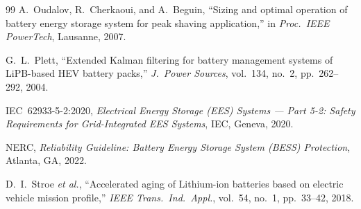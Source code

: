 \documentclass[11pt, a4paper]{article}
\begin{document}
\begin{thebibliography}{99}
A.~Oudalov, R.~Cherkaoui, and A.~Beguin,
``Sizing and optimal operation of battery energy storage system for peak
shaving application,''
in \emph{Proc.\ IEEE PowerTech}, Lausanne, 2007.

G.~L.~Plett,
``Extended Kalman filtering for battery management systems of LiPB-based HEV
battery packs,''
\emph{J.\ Power Sources}, vol.~134, no.~2, pp.~262--292, 2004.

IEC~62933-5-2:2020,
\emph{Electrical Energy Storage (EES) Systems --- Part 5-2: Safety Requirements
for Grid-Integrated EES Systems}, IEC, Geneva, 2020.

NERC, \emph{Reliability Guideline: Battery Energy Storage System (BESS)
Protection}, Atlanta, GA, 2022.

D.~I.~Stroe \emph{et al.},
``Accelerated aging of Lithium-ion batteries based on electric vehicle mission
profile,''
\emph{IEEE Trans.\ Ind.\ Appl.}, vol.~54, no.~1, pp.~33--42, 2018.
\end{thebibliography}
\end{document}
